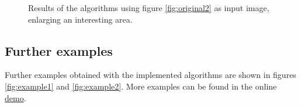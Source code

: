 \documentclass{ipol}
\numberwithin{equation}{section}
\numberwithin{table}{section}
\numberwithin{figure}{section}
\begin{document}
\begin{figure}[h!]
	\quad
	\caption{Results of the algorithms using figure \ref{fig:original2} as input image, enlarging an interesting area.}
	\label{fig:result3}
\end{figure}

\clearpage


\subsection{Further examples}
\label{sec:examples}

Further examples obtained with the implemented algorithms are shown in figures \ref{fig:example1} and \ref{fig:example2}. More examples can be found in the online \href{http://link_to_demo}{demo}. \\
\end{document}
